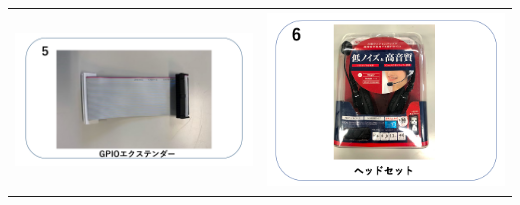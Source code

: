 \begin{tabular}{cc}
  \includegraphics[width=6.488cm,height=4.697cm]{text01-img/textbook-img005-2023.png}
   &
  \includegraphics[width=6.488cm,height=4.697cm]{text01-img/textbook-img006.png}
\end{tabular}

